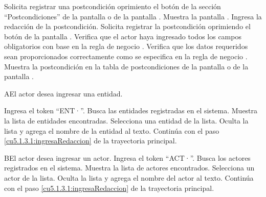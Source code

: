  \begin{UCtrayectoria}
	\UCpaso[\UCactor] Solicita registrar una postcondición oprimiento el botón  de la sección ``Postcondiciones'' de la pantalla  o de la pantalla . 
	\UCpaso[\UCsist] Muestra la pantalla . 
	\UCpaso[\UCactor] Ingresa la redacción de la postcondición.          \label{cu5.1.3.1:ingresaRedaccion}
	\UCpaso[\UCactor] Solicita registrar la postcondición oprimiendo el botón  de la pantalla .  
	\UCpaso[\UCsist] Verifica que el actor haya ingresado todos los campos obligatorios con base en la regla de negocio . 
	\UCpaso[\UCsist] Verifica que los datos requeridos sean proporcionados correctamente como se especifica en la regla de negocio .  
	\UCpaso[\UCsist] Muestra la postcondición en la tabla de postcondiciones de la pantalla  o de la pantalla .
\end{UCtrayectoria}

    

 \begin{UCtrayectoriaA}{A}{El actor desea ingresar una entidad.}
 	
 	 \UCpaso[\UCactor] Ingresa el token ``ENT·''.
 	\UCpaso[\UCsist] Busca las entidades registradas en el sistema. 
 	\UCpaso[\UCsist] Muestra la lista de entidades encontradas.
 	\UCpaso[\UCactor] Selecciona una entidad de la lista.
  	\UCpaso[\UCsist] Oculta la lista y agrega el nombre de la entidad al texto.
    \UCpaso[] Continúa con el paso \ref{cu5.1.3.1:ingresaRedaccion} de la trayectoria principal.
 \end{UCtrayectoriaA}
 
 \begin{UCtrayectoriaA}{B}{El actor desea ingresar un actor.}
 	\UCpaso[\UCactor] Ingresa el token ``ACT·''.
 	\UCpaso[\UCsist] Busca los actores registrados en el sistema. 
 	\UCpaso[\UCsist] Muestra la lista de actores encontrados.
 	\UCpaso[\UCactor] Selecciona un actor de la lista.
  	\UCpaso[\UCsist] Oculta la lista y agrega el nombre del actor al texto.
    \UCpaso[] Continúa con el paso \ref{cu5.1.3.1:ingresaRedaccion} de la trayectoria principal.
 \end{UCtrayectoriaA}

